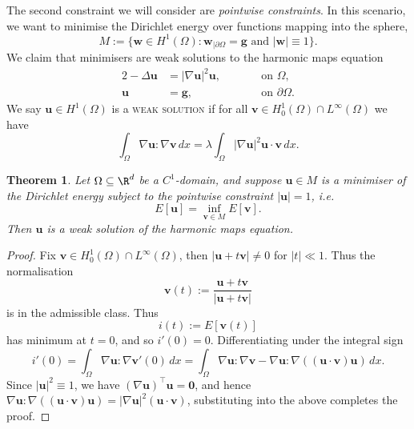 \documentclass[reqno]{amsart}
\newtheorem{theorem}{Theorem}
\theoremstyle{definition}
\theoremstyle{remark}
\renewcommand{\emph}{\textsc}
\let\vec\mathbf
\begin{document}
The second constraint we will consider are \textit{pointwise constraints}. In this scenario, we want to minimise the Dirichlet energy over functions mapping into the sphere, 
	\[ M := \{ \vec w \in H^1 (\Omega) : \vec w_{|\partial \Omega} =\vec  g \text{ and } |\vec w| \equiv 1 \}. \]
We claim that minimisers are weak solutions to the harmonic maps equation
	\begin{alignat*}{2}
				-\Delta \vec u &= |\nabla \vec u|^2 \vec u, 	& \qquad &\text{on } \Omega, \\
				\vec u &= \vec g, 	&	&\text{on } \partial \Omega.
	\end{alignat*}
	We say $\vec u \in H^1 (\Omega)$ is a \emph{weak solution} if for all $\vec v \in H_0^1 (\Omega) \cap L^\infty (\Omega)$ we have
		\[ \int_\Omega \nabla \vec u : \nabla \vec v \, dx = \lambda \int_\Omega |\nabla\vec u|^2 \vec u \cdot \vec v \, dx .\]
\begin{theorem}
	Let $\Omega \subseteq \R^d$ be a $C^1$-domain, and suppose $\vec u \in M$ is a minimiser of the Dirichlet energy subject to the pointwise constraint $|\vec u| = 1$, i.e.
		\[ E[\vec u] = \inf_{\vec v \in M} E[\vec v]. \] 
	Then $\vec u$ is a weak solution of the harmonic maps equation.
\end{theorem}	

\begin{proof}
	Fix $\vec v \in H^1_0 (\Omega) \cap L^\infty (\Omega)$, then $|\vec u + t \vec v| \neq 0$ for $|t| \ll 1$. Thus the normalisation 
		\[ \vec v (t) := \frac{\vec u + t \vec v}{|\vec u + t \vec v|}  \]
	is in the admissible class. Thus 
		\[  i (t) := E[\vec v(t)]\]
	has minimum at $t = 0$, and so $i'(0) = 0$. Differentiating under the integral sign
		\[  i'(0) = \int_\Omega \nabla \vec u : \nabla \vec v' (0) \, dx = \int_\Omega \nabla \vec u : \nabla \vec v - \nabla \vec u : \nabla ((\vec u \cdot \vec v) \vec u)\,  dx.\]
	Since $|\vec u|^2 \equiv 1$, we have $(\nabla \vec u)^{\top} \vec u = \vec 0$, and hence	$\nabla \vec u : \nabla ((\vec u \cdot \vec v) \vec u) = |\nabla \vec u|^2 (\vec u \cdot \vec v)$, substituting into the above completes the proof. 
\end{proof}




\end{document}
